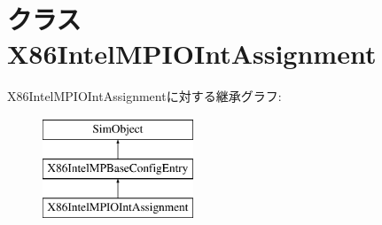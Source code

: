\hypertarget{classIntelMP_1_1X86IntelMPIOIntAssignment}{
\section{クラス X86IntelMPIOIntAssignment}
\label{classIntelMP_1_1X86IntelMPIOIntAssignment}
}
X86IntelMPIOIntAssignmentに対する継承グラフ:\begin{figure}[H]
\begin{center}
\leavevmode
\includegraphics[height=3cm]{classIntelMP_1_1X86IntelMPIOIntAssignment}
\end{center}
\end{figure}
